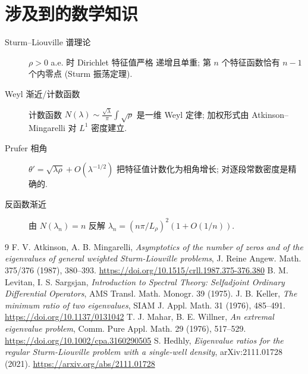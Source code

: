 \documentclass[UTF8]{ctexart}
\begin{document}
\section{涉及到的数学知识}

\begin{description}
	\item[Sturm--Liouville 谱理论] $\rho > 0$ a.e. 时 Dirichlet 特征值严格
		递增且单重; 第 $n$ 个特征函数恰有 $n-1$ 个内零点 (Sturm 振荡定理).
	\item[Weyl 渐近/计数函数] 计数函数 $N(\lambda) \sim
		\frac{\sqrt\lambda}{\pi}\int\sqrt\rho$ 是一维 Weyl 定律;
		加权形式由 Atkinson--Mingarelli \cite{am1987} 对 $L^1$ 密度建立.
	\item[Prufer 相角] $\theta' = \sqrt{\lambda\rho} + O(\lambda^{-1/2})$
		把特征值计数化为相角增长; 对逐段常数密度是精确的.
	\item[反函数渐近] 由 $N(\lambda_n) = n$ 反解
		$\lambda_n = (n\pi/L_\rho)^2(1+O(1/n))$.
\end{description}

\begin{thebibliography}{9}
 F. V. Atkinson, A. B. Mingarelli, \emph{Asymptotics of the
	number of zeros and of the eigenvalues of general weighted
	Sturm-Liouville problems}, J. Reine Angew. Math. 375/376 (1987),
	380--393. \url{https://doi.org/10.1515/crll.1987.375-376.380}
 B. M. Levitan, I. S. Sargsjan, \emph{Introduction to Spectral
	Theory: Selfadjoint Ordinary Differential Operators}, AMS Transl.
	Math. Monogr. 39 (1975).
 J. B. Keller, \emph{The minimum ratio of two eigenvalues},
	SIAM J. Appl. Math. 31 (1976), 485--491.
	\url{https://doi.org/10.1137/0131042}
 T. J. Mahar, B. E. Willner, \emph{An extremal eigenvalue problem},
	Comm. Pure Appl. Math. 29 (1976), 517--529.
	\url{https://doi.org/10.1002/cpa.3160290505}
 S. Hedhly, \emph{Eigenvalue ratios for the regular
	Sturm-Liouville problem with a single-well density}, arXiv:2111.01728
	(2021). \url{https://arxiv.org/abs/2111.01728}
\end{thebibliography}
\end{document}
